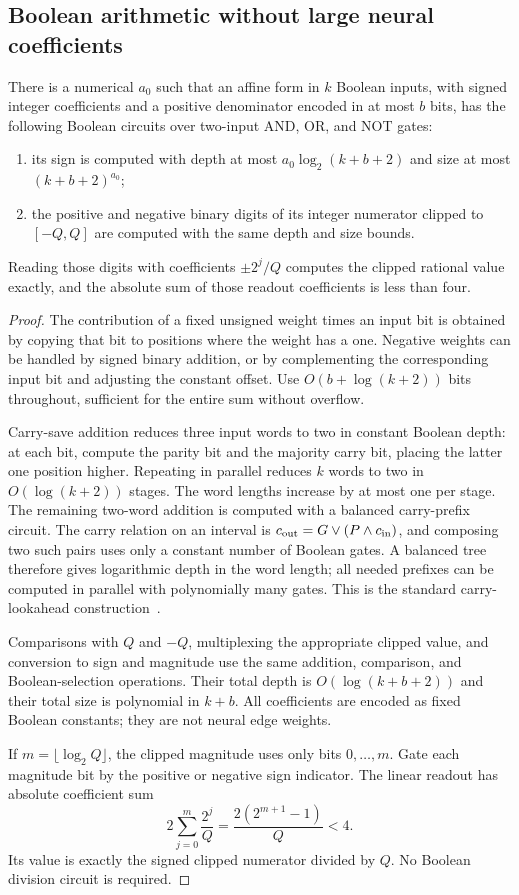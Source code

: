 \subsection{Boolean arithmetic without large neural coefficients}
\begin{lemma}
\label{lem:boolean-arithmetic}
There is a numerical $a_0$ such that an affine form in $k$ Boolean inputs, with signed integer coefficients and a positive denominator encoded in at most $b$ bits, has the following Boolean circuits over two-input AND, OR, and NOT gates:
\begin{enumerate}
\item its sign is computed with depth at most $a_0\log_2(k+b+2)$ and size at most $(k+b+2)^{a_0}$;
\item the positive and negative binary digits of its integer numerator clipped to $[-Q,Q]$ are computed with the same depth and size bounds.
\end{enumerate}
Reading those digits with coefficients $\pm2^j/Q$ computes the clipped rational value exactly, and the absolute sum of those readout coefficients is less than four.
\end{lemma}
\begin{proof}
The contribution of a fixed unsigned weight times an input bit is obtained by copying that bit to positions where the weight has a one. Negative weights can be handled by signed binary addition, or by complementing the corresponding input bit and adjusting the constant offset. Use $O(b+\log(k+2))$ bits throughout, sufficient for the entire sum without overflow.

Carry-save addition reduces three input words to two in constant Boolean depth: at each bit, compute the parity bit and the majority carry bit, placing the latter one position higher. Repeating in parallel reduces $k$ words to two in $O(\log(k+2))$ stages. The word lengths increase by at most one per stage. The remaining two-word addition is computed with a balanced carry-prefix circuit. The carry relation on an interval is $c_{\rm out}=G\lor(P\land c_{\rm in})$, and composing two such pairs uses only a constant number of Boolean gates. A balanced tree therefore gives logarithmic depth in the word length; all needed prefixes can be computed in parallel with polynomially many gates. This is the standard carry-lookahead construction~\cite{brentkung}.

Comparisons with $Q$ and $-Q$, multiplexing the appropriate clipped value, and conversion to sign and magnitude use the same addition, comparison, and Boolean-selection operations. Their total depth is $O(\log(k+b+2))$ and their total size is polynomial in $k+b$. All coefficients are encoded as fixed Boolean constants; they are not neural edge weights.

If $m=\lfloor\log_2 Q\rfloor$, the clipped magnitude uses only bits $0,\ldots,m$. Gate each magnitude bit by the positive or negative sign indicator. The linear readout has absolute coefficient sum
\[
 2\sum_{j=0}^{m}\frac{2^j}{Q}
 =\frac{2(2^{m+1}-1)}Q<4.
\]
Its value is exactly the signed clipped numerator divided by $Q$. No Boolean division circuit is required.
\end{proof}

